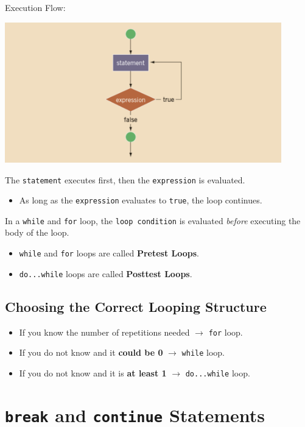 \documentclass{article}
\begin{document}
\vspace{8pt}
Execution Flow:
\begin{center}
    \includegraphics[width=0.9\textwidth]{do-while-exec-flow.png}
\end{center}

The \texttt{statement} executes first, then the \texttt{expression} is
evaluated.
\begin{itemize}
  \item As long as the \texttt{expression} evaluates to \texttt{true}, the loop
    continues.
\end{itemize}
In a \texttt{while} and \texttt{for} loop, the \texttt{loop condition} is
evaluated \textit{before} executing the body of the loop.
\begin{itemize}
  \item \texttt{while} and \texttt{for} loops are called \textbf{Pretest Loops}.
  \item \texttt{do...while} loops are called \textbf{Posttest Loops}.
\end{itemize}

\subsection{Choosing the Correct Looping Structure}
\begin{itemize}
  \item If you know the number of repetitions needed $\rightarrow$ \texttt{for} loop.
  \item If you do not know and it \textbf{could be 0} $\rightarrow$ \texttt{while} loop.
  \item If you do not know and it is \textbf{at least 1} $\rightarrow$ \texttt{do...while} loop.
\end{itemize}

\section{\texttt{break} and \texttt{continue} Statements}
\end{document}
